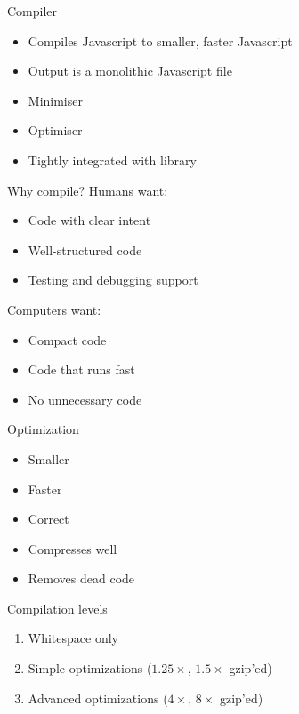 \documentclass{powerdot}
\begin{document}

\begin{slide}{Compiler}
\begin{itemize}
\item Compiles Javascript to smaller, faster Javascript
\item Output is a monolithic Javascript file
\item Minimiser
\item Optimiser
\item Tightly integrated with library
\end{itemize}
\end{slide}

\begin{slide}{Why compile?}
Humans want:
\begin{itemize}
\item Code with clear intent
\item Well-structured code
\item Testing and debugging support
\end{itemize}
Computers want:
\begin{itemize}
\item Compact code
\item Code that runs fast
\item No unnecessary code
\end{itemize}
\end{slide}

\begin{slide}{Optimization}
\begin{itemize}
\item Smaller
\item Faster
\item Correct
\item Compresses well
\item Removes dead code
\end{itemize}
\end{slide}

\begin{slide}{Compilation levels}
\begin{enumerate}
\item Whitespace only
\item Simple optimizations ($1.25\times$, $1.5\times$ gzip'ed)
\item Advanced optimizations ($4\times$, $8\times$ gzip'ed)
\end{enumerate}
\end{slide}
\end{document}
